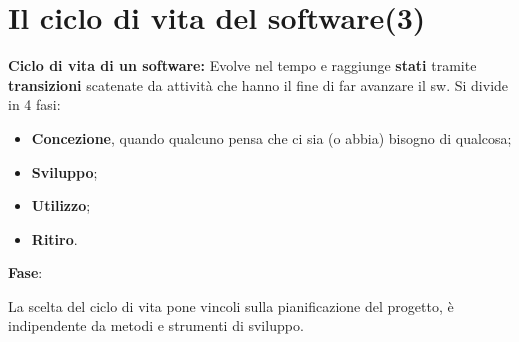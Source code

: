 




\section{Il ciclo di vita del software(3)}

\textbf{Ciclo di vita di un software:} Evolve nel tempo e raggiunge \textbf{stati} tramite \textbf{transizioni} scatenate da attività che hanno il fine di far avanzare il sw. Si divide in 4 fasi:

\begin{itemize}

	\item \textbf{Concezione}, quando qualcuno pensa che ci sia (o abbia) bisogno di qualcosa;
	\item \textbf{Sviluppo};
	\item \textbf{Utilizzo};
	\item \textbf{Ritiro}.

\end{itemize}

\textbf{Fase}:

La scelta del ciclo di vita pone vincoli sulla pianificazione del progetto, è indipendente da metodi e strumenti di sviluppo.\\

